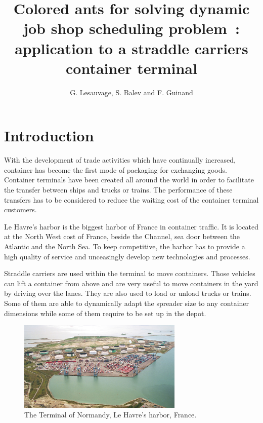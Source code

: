 \documentclass[a4paper,10pt]{article}
\title{Colored ants for solving dynamic job shop scheduling problem : application to a straddle carriers container terminal
}
\author{G. Lesauvage, S. Balev and F. Guinand}
\begin{document}
\maketitle

\begin{abstract}

\end{abstract}

\section{Introduction}

With the development of trade activities which have continually increased, container has become the first mode of packaging for exchanging goods. Container terminals have been created all around the world in order to facilitate the transfer between ships and trucks or trains. The performance of these transfers has to be considered to reduce the waiting cost of the container terminal customers.

Le Havre’s harbor is the biggest harbor of France in container traffic. It is located at the North West cost of France, beside the Channel, sea door between the Atlantic and the North Sea. To keep competitive, the harbor has to provide a high quality of service and unceasingly develop new technologies and processes.

Straddle carriers are used within the terminal to move containers. Those vehicles can lift a container from above and are very useful to move containers in the yard by driving over the lanes. They are also used to load or unload trucks or trains. Some of them are able to dynamically adapt the spreader size to any container dimensions while some of them require to be set up in the depot.%


\begin{figure}
  \begin{center}
  \includegraphics[width=0.7\textwidth]{Figures/terminalOfNormandy}
  \caption{The Terminal of Normandy, Le Havre's harbor, France.}
\end{center}
\end{figure}
\end{document}
